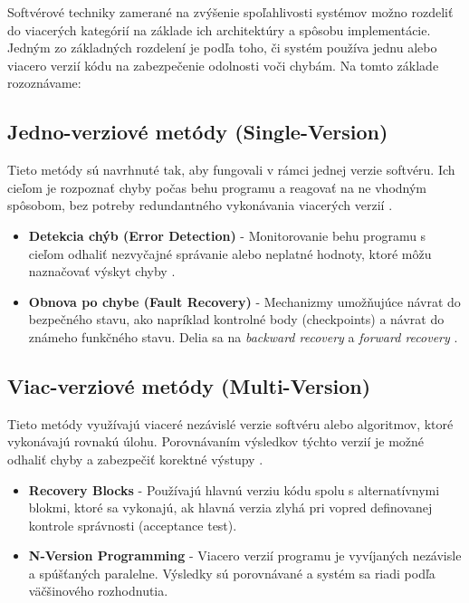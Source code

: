 \documentclass[12pt, letterpaper, slovak]{article}
\begin{document}
Softvérové techniky zamerané na zvýšenie spoľahlivosti systémov možno rozdeliť do viacerých kategórií na základe ich architektúry a spôsobu implementácie. Jedným zo základných rozdelení je podľa toho, či systém používa jednu alebo viacero verzií kódu na zabezpečenie odolnosti voči chybám. Na tomto základe rozoznávame:

\subsection*{Jedno-verziové metódy (Single-Version)}

Tieto metódy sú navrhnuté tak, aby fungovali v rámci jednej verzie softvéru. Ich cieľom je rozpoznať chyby počas behu programu a reagovať na ne vhodným spôsobom, bez potreby redundantného vykonávania viacerých verzií \cite{nasa:sft}.

\begin{itemize}
\item \textbf{Detekcia chýb (Error Detection)} - Monitorovanie behu programu s cieľom odhaliť nezvyčajné správanie alebo neplatné hodnoty, ktoré môžu naznačovať výskyt chyby \cite{nasa:sft}.
\item \textbf{Obnova po chybe (Fault Recovery)} - Mechanizmy umožňujúce návrat do bezpečného stavu, ako napríklad kontrolné body (checkpoints) a návrat do známeho funkčného stavu. Delia sa na \textit{backward recovery} a \textit{forward recovery} \cite{shubu}. 
\end{itemize}

\subsection*{Viac-verziové metódy (Multi-Version)}

Tieto metódy využívajú viaceré nezávislé verzie softvéru alebo algoritmov, ktoré vykonávajú rovnakú úlohu. Porovnávaním výsledkov týchto verzií je možné odhaliť chyby a zabezpečiť korektné výstupy \cite{nasa:sft}.

\begin{itemize}
\item \textbf{Recovery Blocks} \cite{lyu:sft} - Používajú hlavnú verziu kódu spolu s alternatívnymi blokmi, ktoré sa vykonajú, ak hlavná verzia zlyhá pri vopred definovanej kontrole správnosti (acceptance test).
\item \textbf{N-Version Programming} \cite{aa:nvp} - Viacero verzií programu je vyvíjaných nezávisle a spúšťaných paralelne. Výsledky sú porovnávané a systém sa riadi podľa väčšinového rozhodnutia.
\end{itemize}
\end{document}
